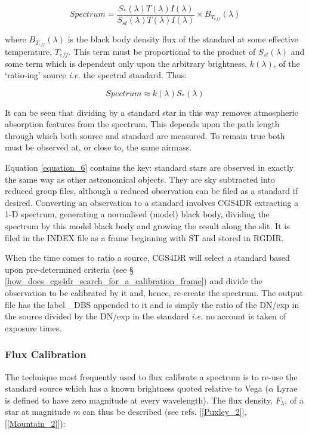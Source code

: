 {\begin{equation}
  Spectrum = \frac{S_{*}(\lambda) T(\lambda) I(\lambda)}{S_{st}(\lambda) T(\lambda) I(\lambda)} \times B_{T_{eff}}(\lambda)
\label{equation_6}
\end{equation}

where $B_{T_{eff}}(\lambda)$ is the black body density flux of the standard 
at some effective temperature, $T_{eff}$. This term must be proportional to 
the product of $S_{st}(\lambda)$ and some term which is dependent only upon 
the arbitrary brightness, $k(\lambda)$, of the `ratio-ing' source {\em i.e.} 
the spectral standard. Thus:

\begin{equation}
  Spectrum \approx k(\lambda) S_{*}(\lambda) 
\label{equation_7}
\end{equation}

It can be seen that dividing by a standard star in this way removes 
atmospheric absorption features from the spectrum. This depends upon the 
path length through which both source and standard are measured. To remain 
true both must be observed at, or close to, the same airmass. 

Equation \ref{equation_6} contains the key:
standard stars are observed in exactly the same way as other astronomical
objects. They are sky subtracted into reduced group files, although a reduced 
observation can be filed as a standard if desired. 
Converting an observation to a standard involves CGS4DR extracting a 1-D
spectrum, generating a normalised (model) black body, dividing the spectrum by
this model black body and growing the result along the slit. It is filed in 
the INDEX file as a frame beginning with ST and stored in RGDIR. 

When the time comes to ratio a source, CGS4DR will select a standard based
upon pre-determined criteria (see \S 
\ref{how_does_cgs4dr_search_for_a_calibration_frame}) and
divide the observation to be calibrated by it and, hence, re-create the 
spectrum. The output file has the label {\sf \_DBS} appended to it and
is simply the ratio of the DN/exp in the source divided by the DN/exp in the 
standard {\em i.e.} no account is taken of exposure times. 

\subsubsection{Flux Calibration}
\label{flux_calibration}

The technique most frequently used to flux calibrate a spectrum is to
re-use the standard source which has a known brightness quoted relative
to Vega ($\alpha$ Lyrae is defined to have zero magnitude at every
wavelength). The flux density, $F_{\lambda}$, of a star at magnitude {\em m} 
can thus be described (see refs. [\ref{Puxley_2}], [\ref{Mountain_2}]):

}
